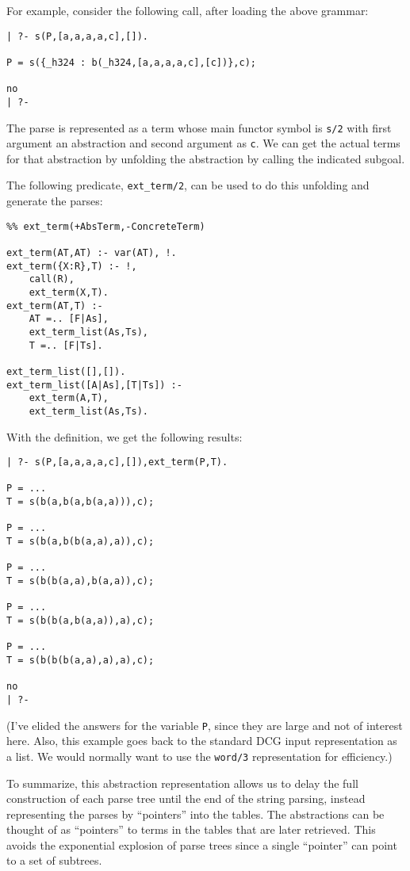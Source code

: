 For example, consider the following call, after loading the above grammar:
\begin{verbatim}
| ?- s(P,[a,a,a,a,c],[]).

P = s({_h324 : b(_h324,[a,a,a,a,c],[c])},c);

no
| ?- 
\end{verbatim}
The parse is represented as a term whose main functor symbol is
\verb|s/2| with first argument an abstraction and second argument 
as \verb|c|.  We can get the actual terms for that abstraction by
unfolding the abstraction by calling the indicated subgoal.

The following predicate, \verb|ext_term/2|, can be used to do this
unfolding and generate the parses:
\begin{verbatim}
%% ext_term(+AbsTerm,-ConcreteTerm)

ext_term(AT,AT) :- var(AT), !.
ext_term({X:R},T) :- !,
	call(R),
	ext_term(X,T).
ext_term(AT,T) :-
	AT =.. [F|As],
	ext_term_list(As,Ts),
	T =.. [F|Ts].

ext_term_list([],[]).
ext_term_list([A|As],[T|Ts]) :-
	ext_term(A,T),
	ext_term_list(As,Ts).
\end{verbatim}

With the definition, we get the following results:
\begin{verbatim}
| ?- s(P,[a,a,a,a,c],[]),ext_term(P,T).

P = ...
T = s(b(a,b(a,b(a,a))),c);

P = ...
T = s(b(a,b(b(a,a),a)),c);

P = ...
T = s(b(b(a,a),b(a,a)),c);

P = ...
T = s(b(b(a,b(a,a)),a),c);

P = ...
T = s(b(b(b(a,a),a),a),c);

no
| ?- 
\end{verbatim}
(I've elided the answers for the variable \verb|P|, since they are
large and not of interest here.  Also, this example goes back to the
standard DCG input representation as a list.  We would normally want
to use the \verb|word/3| representation for efficiency.)

To summarize, this abstraction representation allows us to delay the
full construction of each parse tree until the end of the string
parsing, instead representing the parses by ``pointers'' into the
tables.  The abstractions can be thought of as ``pointers'' to terms in
the tables that are later retrieved.  This avoids the exponential
explosion of parse trees since a single ``pointer'' can point to a set
of subtrees.  

